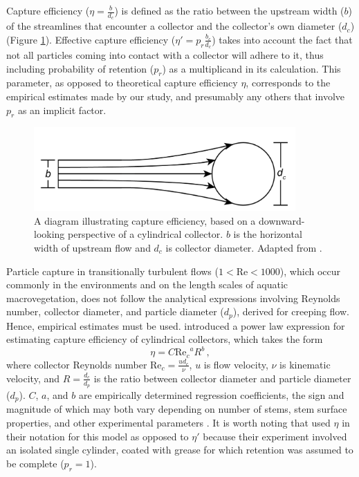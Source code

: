 \documentclass{scrreprt}
\newcommand\Rey{\mathrm{Re}}
\begin{document}
Capture efficiency ($\eta=\frac{b}{d_c}$) is defined as the ratio between the upstream width ($b$) of the streamlines that encounter a collector and the collector's own diameter ($d_c$) (Figure \ref{fig:capeff}). Effective capture efficiency ($\eta\prime=p_r\frac{b_c}{d_c}$) takes into account the fact that not all particles coming into contact with a collector will adhere to it, thus including probability of retention ($p_r$) as a multiplicand in its calculation. This parameter, as opposed to theoretical capture efficiency $\eta$, corresponds to the empirical estimates made by our study, and presumably any others that involve $p_r$ as an implicit factor.

\begin{figure}[htbp]
\includegraphics[width=10cm]{collectorefficiency.png}
\centering
\caption{A diagram illustrating capture efficiency, based on a downward-looking perspective of a cylindrical collector. $b$ is the horizontal width of upstream flow and $d_c$ is collector diameter. Adapted from \citet{Palmer_2004}.}
\label{fig:capeff}
\end{figure}

Particle capture in transitionally turbulent flows ($1<\Rey<1000$), which occur commonly in the environments and on the length scales of aquatic macrovegetation, does not follow the analytical expressions involving Reynolds number, collector diameter, and particle diameter ($d_p$), derived for creeping flow. Hence, empirical estimates must be used. \citet{Palmer_2004} introduced a power law expression for estimating capture efficiency of cylindrical collectors, which takes the form \[\eta=C{\Rey_c}^{a}R^{b}\,,\] where collector Reynolds number $\Rey_c=\frac{ud_c}{\nu}$, $u$ is flow velocity, $\nu$ is kinematic velocity, and $R=\frac{d_c}{d_p}$ is the ratio between collector diameter and particle diameter ($d_p$). $C$, $a$, and $b$ are empirically determined regression coefficients, the sign and magnitude of which may both vary depending on number of stems, stem surface properties, and other experimental parameters \citep[e.g.,][]{Palmer_2004, Fauria_2015}. It is worth noting that \citet{Palmer_2004} used $\eta$ in their notation for this model as opposed to $\eta\prime$ because their experiment involved an isolated single cylinder, coated with grease for which retention was assumed to be complete ($p_r = 1$).
\end{document}
